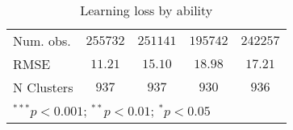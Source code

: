 \begin{table}
\begin{center}
\begin{tabular}{l c c c c}
Num. obs.                    & $255732$      & $251141$      & $195742$      & $242257$      \\
RMSE                         & $11.21$       & $15.10$       & $18.98$       & $17.21$       \\
N Clusters                   & $937$         & $937$         & $930$         & $936$         \\
\hline
\multicolumn{5}{l}{\scriptsize{$^{***}p<0.001$; $^{**}p<0.01$; $^{*}p<0.05$}}
\end{tabular}
\caption{Learning loss by ability}
\label{tableability}
\end{center}
\end{table}
